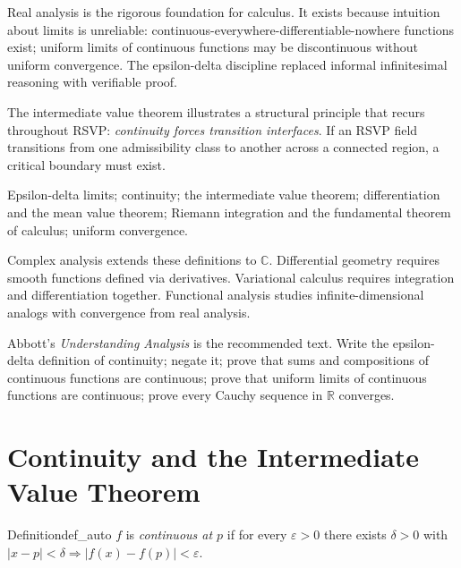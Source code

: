 \documentclass[12pt, twoside, openright, a4paper]{book}
\newcommand{\R}{\mathbb{R}}
\newcommand{\C}{\mathbb{C}}
\begin{document}
\begin{motivation}
Real analysis is the rigorous foundation for calculus.
It exists because intuition about limits is unreliable: continuous-everywhere-differentiable-nowhere functions exist; uniform limits of continuous functions may be discontinuous without uniform convergence.
The epsilon-delta discipline replaced informal infinitesimal reasoning with verifiable proof.

The intermediate value theorem illustrates a structural principle that recurs throughout RSVP: \emph{continuity forces transition interfaces}.
If an RSVP field transitions from one admissibility class to another across a connected region, a critical boundary must exist.
\end{motivation}

\begin{structures}
Epsilon-delta limits; continuity; the intermediate value theorem; differentiation and the mean value theorem; Riemann integration and the fundamental theorem of calculus; uniform convergence.
\end{structures}

\begin{dependencies}
Complex analysis extends these definitions to $\C$.
Differential geometry requires smooth functions defined via derivatives.
Variational calculus requires integration and differentiation together.
Functional analysis studies infinite-dimensional analogs with convergence from real analysis.
\end{dependencies}

\begin{exercises_box}
Abbott's \textit{Understanding Analysis} is the recommended text.
Write the epsilon-delta definition of continuity; negate it; prove that sums and compositions of continuous functions are continuous; prove that uniform limits of continuous functions are continuous; prove every Cauchy sequence in $\R$ converges.
\end{exercises_box}

\section{Continuity and the Intermediate Value Theorem}

\begin{definition}{Definition}{def_auto}
$f$ is \emph{continuous at $p$} if for every $\varepsilon > 0$ there exists $\delta > 0$ with $|x-p| < \delta \Rightarrow |f(x)-f(p)| < \varepsilon$.
\end{definition}
\end{document}
